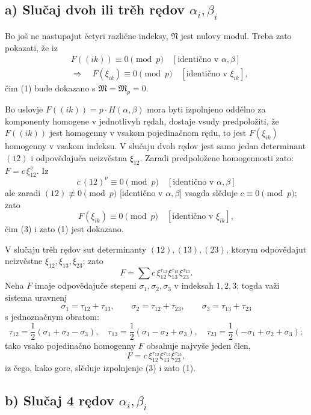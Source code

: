 \documentclass[11pt]{article}
\providecommand{\frM}{\mathfrak M}
\providecommand{\frN}{\mathfrak N}
\begin{document}
\subsection*{a) Slučaj dvoh ili trěh rędov \(\alpha_i,\beta_i\)}

Bo još ne nastupajut četyri različne indeksy, \(\frN\) jest nulovy modul. Treba zato pokazati, že iz
\begin{equation}
\begin{aligned}
        &F((ik))\equiv0\pmod p\quad [\text{identično v \(\alpha,\beta\)}]\\
        &\Longrightarrow\quad
        F(\xi_{ik})\equiv0\pmod p\quad [\text{identično v \(\xi_{ik}\)}],
\end{aligned}
\end{equation}
čim (1) bude dokazano s \(\frM=\frM_p=0\).

Bo uslovje \(F((ik))=p\cdot H(\alpha,\beta)\) mora byti izpolnjeno oddělno za komponenty homogene v jednotlivyh rędah, dostaje vsudy predpoložiti, že \(F((ik))\) jest homogenny v vsakom pojedinačnom rędu, to jest \(F(\xi_{ik})\) homogenny v vsakom indeksu. V slučaju dvoh rędov jest samo jedan determinant \((12)\) i odpovědajuča neizvěstna \(\xi_{12}\). Zaradi predpoložene homogennosti zato: \(F=c\,\xi_{12}^\nu\). Iz
\[
        c\,(12)^\nu\equiv0\pmod p\quad[\text{identično v \(\alpha,\beta\)}]
\]
ale zaradi \((12)\not\equiv0\pmod p\) [identično v \(\alpha,\beta\)] vsagda slěduje \(c\equiv0\pmod p\); zato
\[
        F(\xi_{ik})\equiv0\pmod p\quad [\text{identično v \(\xi_{ik}\)}],
\]
čim (3) i zato (1) jest dokazano.

V slučaju trěh rędov sut determinanty \((12),(13),(23)\), ktorym odpovědajut neizvěstne \(\xi_{12},\xi_{13},\xi_{23}\); zato
\[
        F=\sum c\,\xi_{12}^{\tau_{12}}\xi_{13}^{\tau_{13}}\xi_{23}^{\tau_{23}}.
\]
Neha \(F\) imaje odpovědajuče stepeni \(\sigma_1,\sigma_2,\sigma_3\) v indeksah \(1,2,3\); togda važi sistema uravnenj
\[
        \sigma_1=\tau_{12}+\tau_{13},\qquad
        \sigma_2=\tau_{12}+\tau_{23},\qquad
        \sigma_3=\tau_{13}+\tau_{23}
\]
s jednoznačnym obratom:
\[
        \tau_{12}=\frac12(\sigma_1+\sigma_2-\sigma_3),\quad
        \tau_{13}=\frac12(\sigma_1-\sigma_2+\sigma_3),\quad
        \tau_{23}=\frac12(-\sigma_1+\sigma_2+\sigma_3);
\]
tako vsako pojedinačno homogenny \(F\) obsahuje najvyše jeden člen,
\[
        F=c\,\xi_{12}^{\tau_{12}}\xi_{13}^{\tau_{13}}\xi_{23}^{\tau_{23}},
\]
iz čego, kako gore, slěduje izpolnjenje (3) i zato (1).

\subsection*{b) Slučaj 4 rędov \(\alpha_i,\beta_i\)}
\end{document}
